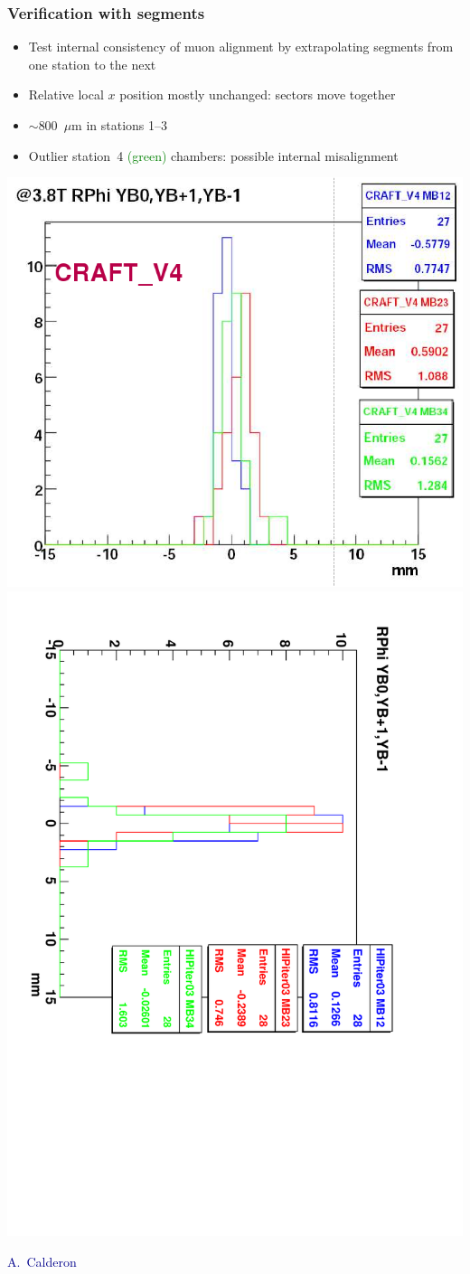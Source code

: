 \documentclass[compress]{beamer}
\begin{document}
\begin{frame}
\frametitle{Verification with segments}

\begin{itemize}
\item Test internal consistency of muon alignment by extrapolating segments from one station to the next
\item Relative local $x$ position mostly unchanged: sectors move together
\item $\sim$800~$\mu$m in stations 1--3
\item Outlier station~4 \textcolor{green}{(green)} chambers: possible internal misalignment
\end{itemize}

\vfill\includegraphics[width=0.5\linewidth]{alicia_v4_rphi.png}\includegraphics[height=0.5\linewidth, angle=90]{RPhires_YB0YB1YBm1_HIPiter03_InOut_38T-1.pdf}

\hfill \scriptsize \textcolor{darkblue}{A.~Calderon}
\end{frame}
\end{document}
